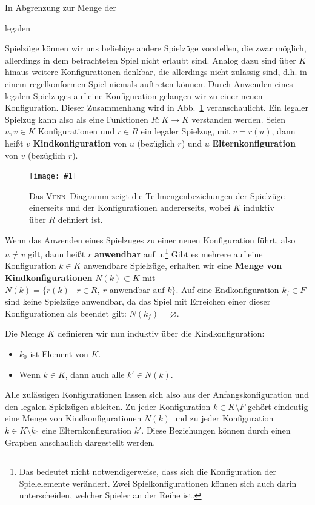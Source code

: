 \documentclass[a4paper,twoside]{scrartcl}
\let\emptyset\varnothing
\newcommand\e[1]{\begin{em}#1\end{em}}
\newcommand\g[4]{%
  \begin{figure}[!ht]
  \centering
  \texttt{[image: \#1]}
  \caption{#3\label{fig:#2}}
  \end{figure}}
\begin{document}
In Abgrenzung zur Menge der \e{legalen} Spielzüge können wir uns beliebige andere Spielzüge vorstellen, die zwar möglich, allerdings in dem betrachteten Spiel nicht erlaubt sind. Analog dazu sind über $K$ hinaus weitere Konfigurationen denkbar, die allerdings nicht zulässig sind, d.h. in einem regelkonformen Spiel niemals auftreten können. Durch Anwenden eines legalen Spielzuges auf eine Konfiguration gelangen wir zu einer neuen Konfiguration. Dieser Zusammenhang wird in Abb.~\ref{fig:venn} veranschaulicht. Ein legaler Spielzug kann also als eine Funktionen $R:K \to K$ verstanden werden. Seien $u,v \in K$ Konfigurationen und $r \in R$ ein legaler Spielzug, mit $v = r(u)$, dann heißt $v$ \textbf{Kindkonfiguration} von $u$ (bezüglich $r$) und $u$ \textbf{Elternkonfiguration} von $v$ (bezüglich $r$). 

\g{img/spielzuege.pdf}{venn}{Das \textsc{Venn}--Diagramm zeigt die Teilmengenbeziehungen der Spielzüge einerseits und der Konfigurationen andererseits, wobei $K$ induktiv über $R$ definiert ist.}{.9}

Wenn das Anwenden eines Spielzuges zu einer neuen Konfiguration führt, also $u \neq v$ gilt, dann heißt $r$ \textbf{anwendbar} auf u.\footnote{Das bedeutet nicht notwendigerweise, dass sich die Konfiguration der Spielelemente verändert. Zwei Spielkonfigurationen können sich auch darin unterscheiden, welcher Spieler an der Reihe ist.} Gibt es mehrere auf eine Konfiguration $k \in K$ anwendbare Spielzüge, erhalten wir eine \textbf{Menge von Kindkonfigurationen} $N(k) \subset K$ mit $N(k) = \{r(k) \mid r \in R,~r \textrm{ anwendbar auf } k\}$. Auf eine Endkonfiguration $k_f \in F$ sind keine Spielzüge anwendbar, da das Spiel mit Erreichen einer dieser Konfigurationen als beendet gilt: $N(k_f) = \emptyset$.

Die Menge $K$ definieren wir nun induktiv über die Kindkonfiguration: 
\begin{itemize}
	\item $k_0$ ist Element von $K$.
	\item Wenn $k \in K$, dann auch alle $k' \in N(k)$.
\end{itemize}

Alle zulässigen Konfigurationen lassen sich also aus der Anfangskonfiguration und den legalen Spielzügen ableiten. Zu jeder Konfiguration $k \in K \setminus F$ gehört eindeutig eine Menge von Kindkonfigurationen $N(k)$ und zu jeder Konfiguration $k \in K \setminus k_0$ eine Elternkonfiguration $k'$. Diese Beziehungen können durch einen Graphen anschaulich dargestellt werden.
\end{document}

